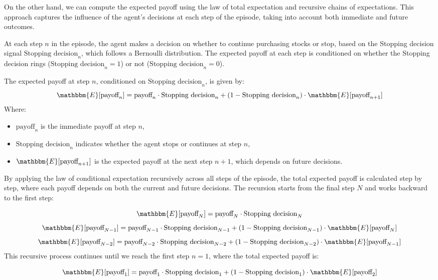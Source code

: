 \documentclass[a4paper, 12pt]{article}
\begin{document}
On the other hand, we can compute the expected payoff using the law of total expectation and recursive chains of expectations. This approach captures the influence of the agent's decisions at each step of the episode, taking into account both immediate and future outcomes.

At each step \( n \) in the episode, the agent makes a decision on whether to continue purchasing stocks or stop, based on the Stopping decision signal \( \text{Stopping decision}_n \), which follows a Bernoulli distribution. The expected payoff at each step is conditioned on whether the Stopping decision rings (\( \text{Stopping decision}_n = 1 \)) or not (\( \text{Stopping decision}_n = 0 \)).

The expected payoff at step \( n \), conditioned on \( \text{Stopping decision}_n \), is given by:
\[
\mathbbm{E}[\text{payoff}_n] = \text{payoff}_n \cdot \text{Stopping decision}_n + (1 - \text{Stopping decision}_n) \cdot \mathbbm{E}[\text{payoff}_{n+1}]
\]
Where:
\begin{itemize}
    \item \( \text{payoff}_n \) is the immediate payoff at step \( n \),
    \item \( \text{Stopping decision}_n \) indicates whether the agent stops or continues at step \( n \),
    \item \( \mathbbm{E}[\text{payoff}_{n+1}] \) is the expected payoff at the next step \( n+1 \), which depends on future decisions.
\end{itemize}

By applying the law of conditional expectation recursively across all steps of the episode, the total expected payoff is calculated step by step, where each payoff depends on both the current and future decisions. The recursion starts from the final step \( N \) and works backward to the first step:

\[
\mathbbm{E}[\text{payoff}_N] = \text{payoff}_N \cdot \text{Stopping decision}_N
\]
\[
\mathbbm{E}[\text{payoff}_{N-1}] = \text{payoff}_{N-1} \cdot \text{Stopping decision}_{N-1} + (1 - \text{Stopping decision}_{N-1}) \cdot \mathbbm{E}[\text{payoff}_N]
\]
\[
\mathbbm{E}[\text{payoff}_{N-2}] = \text{payoff}_{N-2} \cdot \text{Stopping decision}_{N-2} + (1 - \text{Stopping decision}_{N-2}) \cdot \mathbbm{E}[\text{payoff}_{N-1}]
\]
This recursive process continues until we reach the first step \( n = 1 \), where the total expected payoff is:

\[
\mathbbm{E}[\text{payoff}_1] = \text{payoff}_1 \cdot \text{Stopping decision}_1 + (1 - \text{Stopping decision}_1) \cdot \mathbbm{E}[\text{payoff}_2]
\]
\end{document}
